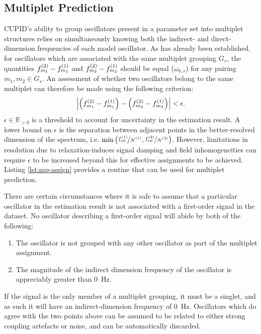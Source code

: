 \subsection{Multiplet Prediction}
\label{subsec:mp-selection}
\ac{CUPID}'s ability to group oscillators present in a parameter set into
multiplet structures relies on simultaneously knowing both the indirect- and
direct-dimension frequencies of each model oscillator. As has already been
established, for oscillators which are associated with the same multiplet
grouping $G_s$, the quantities $f^{(2)}_{m_1} - f^{(1)}_{m_1}$ and $f^{(2)}_{m_2} -
f^{(1)}_{m_2}$ should be equal ($\omega_{0,s}$) for any pairing  $m_1, m_2 \in
G_s$. An assessment of whether two oscillators belong to the same multiplet can
therefore be made using the following criterion:
\begin{equation}
    \left \lvert
        \left( f^{(2)}_{m_1} - f^{(1)}_{m_1} \right) -
        \left( f^{(2)}_{m_2} - f^{(1)}_{m_2} \right)
    \right \rvert < \epsilon.
\end{equation}
$\epsilon \in \mathbb{R}_{>0}$ is a threshold to account for uncertainty in
the estimation result. A lower bound on $\epsilon$ is the separation between
adjacent points in the better-resolved dimension of the spectrum, i.e.
$\min\left(\nicefrac{\fswone}{\None},
\nicefrac{\fswtwo}{\Ntwo}\right)$.  However, limitations in resolution due to
relaxation-induces signal damping and field inhomogeneities can require
$\epsilon$ to be increased beyond this for effective assignments
to be achieved. Listing \cref{lst:mp-assign} provides a \Python routine that
can be used for multiplet prediction.

There are certain circumstances where it is safe to assume that a
particular oscillator in the estimation result is not associated with a
first-order signal in the dataset.
No oscillator describing a first-order signal will abide by both of the
following:
\begin{enumerate}
    \item The oscillator is not grouped with any other oscillator as part of
        the multiplet assignment.
    \item The magnitude of the indirect dimension frequency of the oscillator
        is appreciably greater than \qty{0}{\hertz}.
\end{enumerate}
If the signal is the only
member of a multiplet grouping, it must be a singlet, and as such it will have
an indirect-dimension frequency of \qty{0}{\hertz}. Oscillators which do agree
with the two points above can be assumed to be related to either strong
coupling artefacts or noise, and can be automatically discarded.
